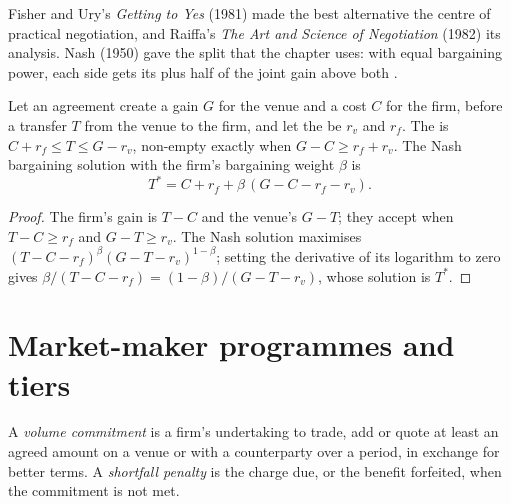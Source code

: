 Fisher and Ury's \emph{Getting to Yes} (1981) made the best alternative the centre of practical negotiation, and Raiffa's \emph{The Art and
Science of Negotiation} (1982) its analysis. Nash (1950) gave the split that the chapter uses: with equal bargaining power, each side gets its
 plus half of the joint gain above both .

\begin{proposition}\label{prop:fm:commercial-relationships-with-venues-brokers-and-vendors:nash}
Let an agreement create a gain $G$ for the venue and a cost $C$ for the firm, before a transfer $T$ from the venue to the firm, and let the
 be $r_v$ and $r_f$. The  is $C+r_f\le T\le G-r_v$, non-empty exactly when $G-C\ge r_f+r_v$. The
Nash bargaining solution with the firm's bargaining weight $\beta$ is
\[
T^*=C+r_f+\beta\,(G-C-r_f-r_v).
\]
\end{proposition}

\begin{proof}
The firm's gain is $T-C$ and the venue's $G-T$; they accept when $T-C\ge r_f$ and $G-T\ge r_v$. The Nash solution maximises
$(T-C-r_f)^\beta(G-T-r_v)^{1-\beta}$; setting the derivative of its logarithm to zero gives $\beta/(T-C-r_f)=(1-\beta)/(G-T-r_v)$, whose solution is
$T^*$.
\end{proof}

\section{Market-maker programmes and tiers}

\begin{definition}\label{def:fm:commercial-relationships-with-venues-brokers-and-vendors:commit}
A \emph{volume commitment} is a firm's undertaking to trade, add or quote at least an agreed amount on a venue or with a
counterparty over a period, in exchange for better terms. A \emph{shortfall penalty} is the charge due, or the benefit
forfeited, when the commitment is not met.
\end{definition}

